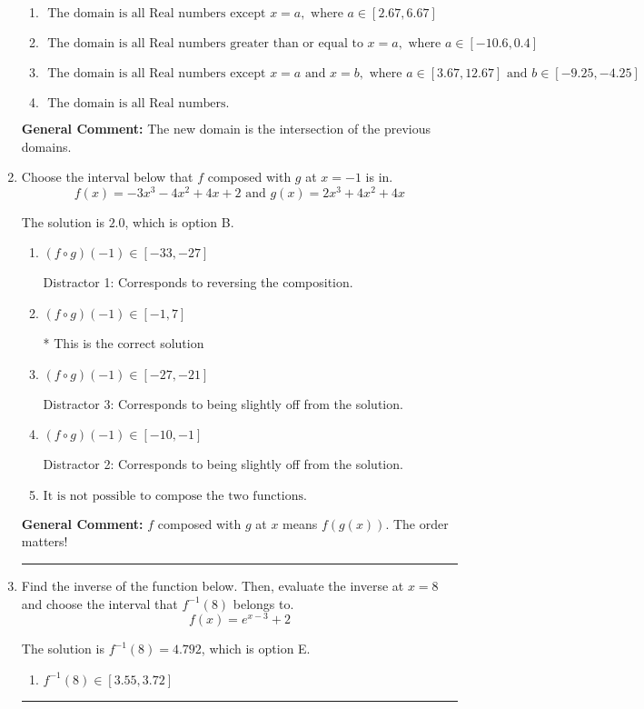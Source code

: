 \documentclass{extbook}[14pt]
\newcommand{\litem}[1]{\item #1

\rule{\textwidth}{0.4pt}}
\begin{document}
\begin{enumerate}
{\begin{enumerate}[label=\Alph*.]
\item \( \text{ The domain is all Real numbers except } x = a, \text{ where } a \in [2.67, 6.67] \)


\item \( \text{ The domain is all Real numbers greater than or equal to } x = a, \text{ where } a \in [-10.6, 0.4] \)


\item \( \text{ The domain is all Real numbers except } x = a \text{ and } x = b, \text{ where } a \in [3.67, 12.67] \text{ and } b \in [-9.25, -4.25] \)


\item \( \text{ The domain is all Real numbers. } \)


\end{enumerate}

\textbf{General Comment:} The new domain is the intersection of the previous domains.
}
\litem{
Choose the interval below that $f$ composed with $g$ at $x=-1$ is in.
\[ f(x) = -3x^{3} -4 x^{2} +4 x + 2 \text{ and } g(x) = 2x^{3} +4 x^{2} +4 x \]

The solution is \( 2.0 \), which is option B.\begin{enumerate}[label=\Alph*.]
\item \( (f \circ g)(-1) \in [-33, -27] \)

 Distractor 1: Corresponds to reversing the composition.
\item \( (f \circ g)(-1) \in [-1, 7] \)

* This is the correct solution
\item \( (f \circ g)(-1) \in [-27, -21] \)

 Distractor 3: Corresponds to being slightly off from the solution.
\item \( (f \circ g)(-1) \in [-10, -1] \)

 Distractor 2: Corresponds to being slightly off from the solution.
\item \( \text{It is not possible to compose the two functions.} \)


\end{enumerate}

\textbf{General Comment:} $f$ composed with $g$ at $x$ means $f(g(x))$. The order matters!
}
\litem{
Find the inverse of the function below. Then, evaluate the inverse at $x = 8$ and choose the interval that $f^{-1}(8)$ belongs to.
\[ f(x) = e^{x-3}+2 \]

The solution is \( f^{-1}(8) = 4.792 \), which is option E.\begin{enumerate}[label=\Alph*.]
\item \( f^{-1}(8) \in [3.55, 3.72] \)


\end{enumerate}}
\end{enumerate}
\end{document}
